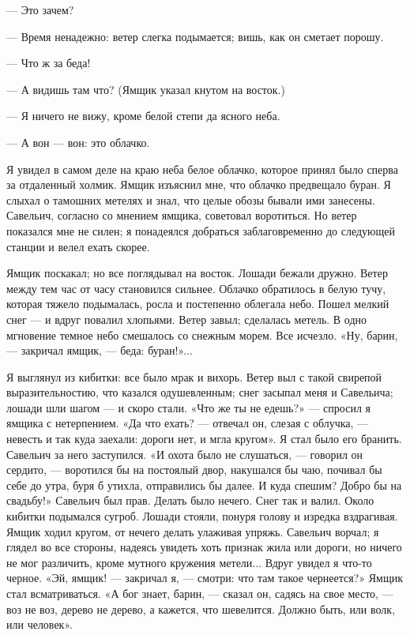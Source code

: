— Это зачем?

— Время ненадежно: ветер слегка подымается; вишь, как он сметает порошу.

— Что ж за беда!

— А видишь там что? (Ямщик указал кнутом на восток.)

— Я ничего не вижу, кроме белой степи да ясного неба.

— А вон — вон: это облачко.

Я увидел в самом деле на краю неба белое облачко, которое принял было сперва за отдаленный холмик. Ямщик изъяснил мне, что облачко предвещало буран.
Я слыхал о тамошних метелях и знал, что целые обозы бывали ими занесены. Савельич, согласно со мнением ямщика, советовал воротиться. Но ветер показался мне не силен; я понадеялся добраться заблаговременно до следующей станции и велел ехать скорее.

Ямщик поскакал; но все поглядывал на восток. Лошади бежали дружно. Ветер между тем час от часу становился сильнее. Облачко обратилось в белую тучу, которая тяжело подымалась, росла и постепенно облегала небо. Пошел мелкий снег — и вдруг повалил хлопьями. Ветер завыл; сделалась метель. В одно мгновение темное небо смешалось со снежным морем. Все исчезло. «Ну, барин, — закричал ямщик, — беда: буран!»...

Я выглянул из кибитки: все было мрак и вихорь. Ветер выл с такой свирепой выразительностию, что казался одушевленным; снег засыпал меня и Савельича; лошади шли шагом — и скоро стали. «Что же ты не едешь?» — спросил я ямщика с нетерпением. «Да что ехать? — отвечал он, слезая с облучка, — невесть и так куда заехали: дороги нет, и мгла кругом». Я стал было его бранить. Савельич за него заступился. «И охота было не слушаться, — говорил он сердито, — воротился бы на постоялый двор, накушался бы чаю, почивал бы себе до утра, буря б утихла, отправились бы далее. И куда спешим? Добро бы на свадьбу!» Савельич был прав. Делать было нечего. Снег так и валил. Около кибитки подымался сугроб. Лошади стояли, понуря голову и изредка вздрагивая. Ямщик ходил кругом, от нечего делать улаживая упряжь. Савельич ворчал; я глядел во все стороны, надеясь увидеть хоть признак жила или дороги, но ничего не мог различить, кроме мутного кружения метели... Вдруг увидел я что-то черное. «Эй, ямщик! — закричал я, — смотри: что там такое чернеется?» Ямщик стал всматриваться. «А бог знает, барин, — сказал он, садясь на свое место, — воз не воз, дерево не дерево, а кажется, что шевелится. Должно быть, или волк, или человек».

